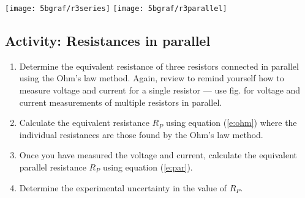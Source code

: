 \begin{multicols}{2}


\begin{center}
   {\texttt{[image: 5bgraf/r3series]}
   \label{f:fig5}} %
   {\texttt{[image: 5bgraf/r3parallel]}
   \label{f:fig6}} %
 \label{f:serpar}
\end{center}


\subsection{Activity: Resistances in parallel}
\begin{enumerate}
	\item Determine the equivalent resistance of three resistors connected in parallel using the Ohm's law method.  Again, review  to remind yourself how to measure voltage and current for a single resistor --- use fig.  for voltage and current measurements of multiple resistors in parallel.
	
	\item Calculate the equivalent resistance $R_P$ using equation (\ref{e:ohm}) where the individual resistances are those found by the Ohm's law method.

	\item Once you have measured the voltage and current, calculate the equivalent parallel resistance $R_P$ using equation (\ref{e:par}).
	
	\item Determine the experimental uncertainty in the value of $R_P$.
\end{enumerate}



\end{multicols}
